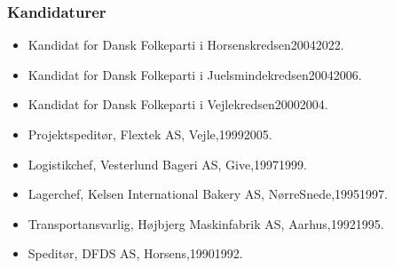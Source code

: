 \documentclass[11pt, a4paper]{awesome-cv}
\begin{document}
\begin{cvletter}
\subsubsection*{Kandidaturer}
\begin{itemize}
\item Kandidat for Dansk Folkeparti i Horsenskredsen20042022.
\item Kandidat for Dansk Folkeparti i Juelsmindekredsen20042006.
\item Kandidat for Dansk Folkeparti i Vejlekredsen20002004.
\end{itemize}
\begin{itemize}
\item Projektspeditør, Flextek AS, Vejle,19992005.
\item Logistikchef, Vesterlund Bageri AS, Give,19971999.
\item Lagerchef, Kelsen International Bakery AS, NørreSnede,19951997.
\item Transportansvarlig, Højbjerg Maskinfabrik AS, Aarhus,19921995.
\item Speditør, DFDS AS, Horsens,19901992.
\end{itemize}
\end{cvletter}
\end{document}
